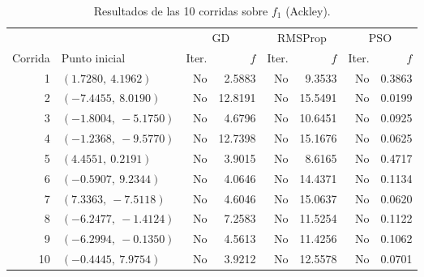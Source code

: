\begin{table}[H]
\centering
\small
\begin{tabular}{rlrrrrrr}
\toprule
 & & \multicolumn{2}{c}{GD} & \multicolumn{2}{c}{RMSProp} & \multicolumn{2}{c}{PSO} \\
\cmidrule(lr){3-4}\cmidrule(lr){5-6}\cmidrule(lr){7-8}
Corrida & Punto inicial & Iter. & $f$ & Iter. & $f$ & Iter. & $f$ \\
\midrule
1 & $(1.7280,\ 4.1962)$ & No & 2.5883 & No & 9.3533 & No & 0.3863 \\
2 & $(-7.4455,\ 8.0190)$ & No & 12.8191 & No & 15.5491 & No & 0.0199 \\
3 & $(-1.8004,\ -5.1750)$ & No & 4.6796 & No & 10.6451 & No & 0.0925 \\
4 & $(-1.2368,\ -9.5770)$ & No & 12.7398 & No & 15.1676 & No & 0.0625 \\
5 & $(4.4551,\ 0.2191)$ & No & 3.9015 & No & 8.6165 & No & 0.4717 \\
6 & $(-0.5907,\ 9.2344)$ & No & 4.0646 & No & 14.4371 & No & 0.1134 \\
7 & $(7.3363,\ -7.5118)$ & No & 4.6046 & No & 15.0637 & No & 0.0620 \\
8 & $(-6.2477,\ -1.4124)$ & No & 7.2583 & No & 11.5254 & No & 0.1122 \\
9 & $(-6.2994,\ -0.1350)$ & No & 4.5613 & No & 11.4256 & No & 0.1062 \\
10 & $(-0.4445,\ 7.9754)$ & No & 3.9212 & No & 12.5578 & No & 0.0701 \\
\bottomrule
\end{tabular}
\caption{Resultados de las 10 corridas sobre $f_1$ (Ackley).}
\label{tab:eval_f1}
\end{table}

